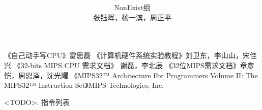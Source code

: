 

\title{ \\ }
\date{}
\author{NonExist组\\张钰晖，杨一滨，周正平}

\maketitle
\clearpage
\tableofcontents









\begin{thebibliography}{9}
     《自己动手写CPU》雷思磊
     《计算机硬件系统实验教程》刘卫东，李山山，宋佳兴
     《32-bits MIPS CPU 需求文档》 谢磊，李北辰
     《32位MIPS需求文档》章彦恺，周恩泽，沈光耀
     《MIPS32™ Architecture For Programmers Volume II: The MIPS32™ Instruction Set》MIPS Technologies, Inc.
\end{thebibliography}

<TODO>: 指令列表


